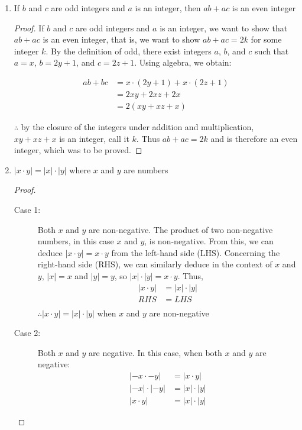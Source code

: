\documentclass[10pt, oneside]{article}
\begin{document}
\begin{enumerate}
    
    \item If $b$ and $c$ are odd integers and $a$ is an integer, then $ab + ac$ is an even integer
    
    \begin{proof}
    If $b$ and $c$ are odd integers and $a$ is an integer, we want to show that $ab + ac$ is an even integer, that is, we want to show $ab + ac = 2k$ for some integer $k$. By the definition of odd, there exist integers $a$, $b$, and $c$ such that $a=x$, $b=2y+1$, and $c=2z+1$. Using algebra, we obtain:
    
    \begin{align*} 
    ab+bc & = x \cdot(2y+1)+ x \cdot(2z+1)\\
    & = 2xy + 2xz + 2x\\
    & = 2(xy+xz+x)
    \end{align*}
    
    $\therefore$ by the closure of the integers under addition and multiplication, $xy+xz+x$ is an integer, call it $k$. Thus $ab+ac = 2k$ and is therefore an even integer, which was to be proved.
    \end{proof}
    
    \item $|x \cdot y| = |x| \cdot |y|$ where $x$ and $y$ are numbers
    
    \begin{proof}
    
    \begin{description}
        \item[Case 1:] Both $x$ and $y$ are non-negative. The product of two non-negative numbers, in this case $x$ and $y$, is non-negative. From this, we can deduce $|x \cdot y| = x \cdot y$ from the left-hand side (LHS). Concerning the right-hand side (RHS), we can similarly deduce in the context of $x$ and $y$, $|x| = x$ and $|y| = y$, so $|x| \cdot |y| = x \cdot y$. Thus,
        \begin{align*}
        |x\cdot y| & = |x| \cdot |y|\\
        RHS & = LHS\\
        \end{align*}
        $\therefore |x \cdot y| = |x| \cdot |y|$ when $x$ and $y$ are non-negative
        
        \item[Case 2:] Both $x$ and $y$ are negative. In this case, when both $x$ and $y$ are negative: 
        \begin{align*}
        |-x \cdot -y| & = |x\cdot y|\\
        |-x|\cdot |-y| & = |x| \cdot |y|\\
        |x\cdot y| & = |x| \cdot |y|
        \end{align*}
        

\end{description}
\end{proof}
\end{enumerate}
\end{document}
